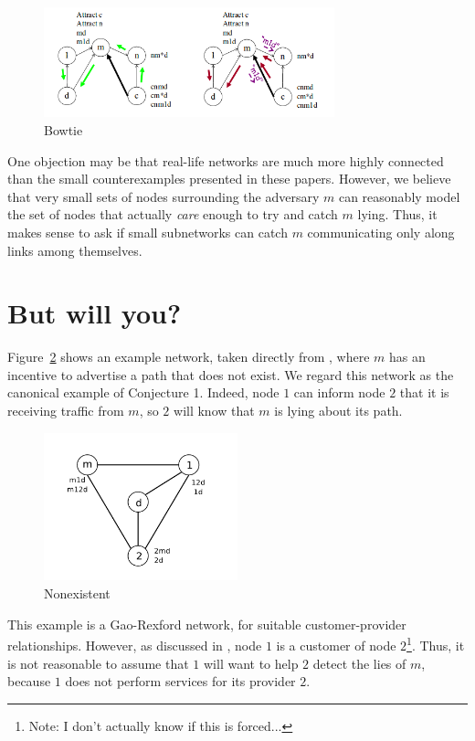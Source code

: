 \documentclass[12pt]{article}
\begin{document}
    \begin{figure}[h]
      \centering
      \caption{Bowtie}\label{fig:Bowtie}
      \includegraphics[width=0.75\textwidth]{Bowtie}
    \end{figure}

    One objection may be that real-life networks are much more highly
    connected than the small counterexamples presented in these papers.
    However, we believe that very small sets of nodes surrounding
    the adversary $m$ can reasonably model the set of nodes
    that actually \emph{care} enough to try and catch $m$ lying.
    Thus, it makes sense to ask if small subnetworks can catch $m$
    communicating only along links among themselves.


\section{But will you?}
  Figure~\ref{fig:Nonexistent} shows an example network,
  taken directly from \cite{RoutingGames}, where $m$ has an incentive
  to advertise a path that does not exist.
  We regard this network as the canonical example of Conjecture 1.
  Indeed, node $1$ can inform node $2$ that it is receiving traffic
  from $m$, so $2$ will know that $m$ is lying about its path.
  \begin{figure}[h]
    \centering
    \caption{Nonexistent}\label{fig:Nonexistent}
    \includegraphics[width=0.5\textwidth]{Nonexistent}
  \end{figure}

  This example is a Gao-Rexford network, for suitable customer-provider
  relationships. However, as discussed in \cite{RoutingGames},
  node $1$ is a customer of node $2$\footnote{
    Note: I don't actually know if this is forced...
  }.
  Thus, it is not reasonable to assume that $1$ will want to help
  $2$ detect the lies of $m$, because $1$ does not perform services
  for its provider $2$.
\end{document}
